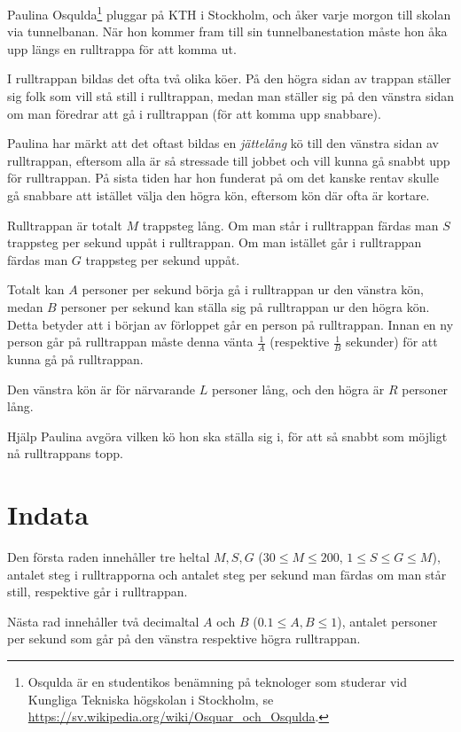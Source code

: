 Paulina Osqulda\footnote{Osqulda är en studentikos benämning på teknologer som studerar vid Kungliga Tekniska högskolan i Stockholm, se \url{https://sv.wikipedia.org/wiki/Osquar_och_Osqulda}.} pluggar på KTH i Stockholm, och åker varje morgon till skolan via tunnelbanan.
När hon kommer fram till sin tunnelbanestation måste hon åka upp längs en rulltrappa för att komma ut.

I rulltrappan bildas det ofta två olika köer.
På den högra sidan av trappan ställer sig folk som vill stå still i rulltrappan, medan man ställer sig på den vänstra sidan om man föredrar att gå i rulltrappan (för att komma upp snabbare).

Paulina har märkt att det oftast bildas en \emph{jättelång} kö till den vänstra sidan av rulltrappan, eftersom alla är så stressade till jobbet och vill kunna gå snabbt upp för rulltrappan.
På sista tiden har hon funderat på om det kanske rentav skulle gå snabbare att istället välja den högra kön, eftersom kön där ofta är kortare.

Rulltrappan är totalt $M$ trappsteg lång.
Om man står i rulltrappan färdas man $S$ trappsteg per sekund uppåt i rulltrappan.
Om man istället går i rulltrappan färdas man $G$ trappsteg per sekund uppåt.

Totalt kan $A$ personer per sekund börja gå i rulltrappan ur den vänstra kön, medan $B$ personer per sekund kan ställa sig på rulltrappan ur den högra kön.
Detta betyder att i början av förloppet går en person på rulltrappan.
Innan en ny person går på rulltrappan måste denna vänta $\frac{1}{A}$ (respektive $\frac{1}{B}$ sekunder) för att kunna gå på rulltrappan.

Den vänstra kön är för närvarande $L$ personer lång, och den högra är $R$ personer lång.

Hjälp Paulina avgöra vilken kö hon ska ställa sig i, för att så snabbt som möjligt nå rulltrappans topp.

\section*{Indata}
Den första raden innehåller tre heltal $M, S, G$ ($30 \le M \le 200$, $1 \le S \le G \le M$), antalet steg i rulltrapporna och antalet steg per sekund man färdas om man står still, respektive går i rulltrappan.

Nästa rad innehåller två decimaltal $A$ och $B$ ($0.1 \le A, B \le 1$), antalet personer per sekund som går på den vänstra respektive högra rulltrappan.

